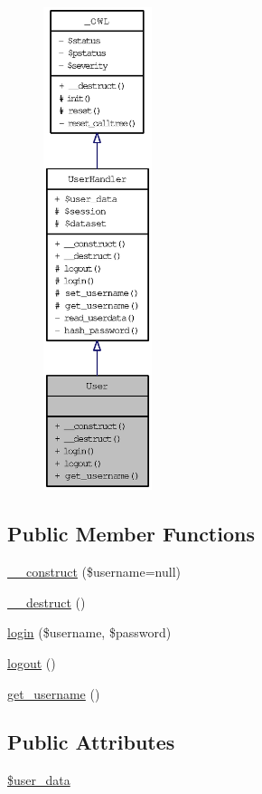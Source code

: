 \begin{figure}[H]
\begin{center}
\leavevmode
\includegraphics[height=400pt]{classUser__coll__graph}
\end{center}
\end{figure}
\subsection*{Public Member Functions}
\begin{CompactItemize}
\item 
\hyperlink{classUser_b8a717f17626301cc8b7815a43ea5b5b}{\_\-\_\-construct} (\$username=null)
\item 
\hyperlink{classUser_ccd20149a7414612c1505e022eb63ffc}{\_\-\_\-destruct} ()
\item 
\hyperlink{classUser_2c4fae5935ebf84e787126795bf42988}{login} (\$username, \$password)
\item 
\hyperlink{classUser_06ed977c877b02b420233d4f18a6a668}{logout} ()
\item 
\hyperlink{classUser_1348ddf190d4df2518665fb51305a902}{get\_\-username} ()
\end{CompactItemize}
\subsection*{Public Attributes}
\begin{CompactItemize}
\item 
\hyperlink{classUserHandler_e7a2d59eee65560ac96b860e828bb445}{\$user\_\-data}
\end{CompactItemize}
